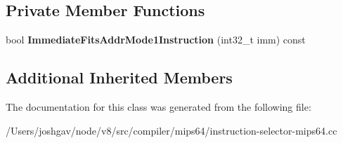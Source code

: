 \subsection*{Private Member Functions}
\begin{DoxyCompactItemize}
\item 
bool {\bfseries Immediate\+Fits\+Addr\+Mode1\+Instruction} (int32\+\_\+t imm) const \hypertarget{classv8_1_1internal_1_1compiler_1_1_mips64_operand_generator_a8b5ea549352f0841e6ae6f92aee853f9}{}\label{classv8_1_1internal_1_1compiler_1_1_mips64_operand_generator_a8b5ea549352f0841e6ae6f92aee853f9}

\end{DoxyCompactItemize}
\subsection*{Additional Inherited Members}


The documentation for this class was generated from the following file\+:\begin{DoxyCompactItemize}
\item 
/\+Users/joshgav/node/v8/src/compiler/mips64/instruction-\/selector-\/mips64.\+cc\end{DoxyCompactItemize}
